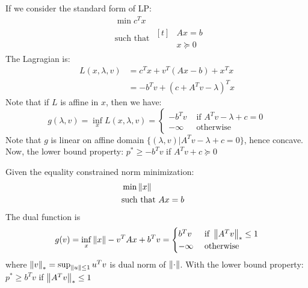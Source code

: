 \begin{remark}
    If we consider the standard form of LP:
    \begin{equation*}
    \begin{aligned}
        &\min c^Tx \\
        &\text{such that } \begin{aligned}[t]
            &Ax = b \\
            &x\succeq 0
        \end{aligned}
    \end{aligned}
    \end{equation*}
    The Lagragian is:
    \begin{equation*}
    \begin{aligned}
        L(x, \lambda, v) &= c^Tx + v^T(Ax-b) + x^Tx \\ 
        &= -b^Tv + (c+A^Tv-\lambda)^T x
    \end{aligned}
    \end{equation*}
    Note that if $L$ is affine in $x$, then we have:
    \begin{equation*}
        g(\lambda, v) = \inf_x L(x, \lambda, v) = \begin{cases}
            -b^Tv &\text{ if } A^Tv - \lambda + c = 0 \\
            -\infty &\text{ otherwise }
        \end{cases}
    \end{equation*}
    Note that $g$ is linear on affine domain $\{ (\lambda, v) | A^Tv - \lambda + c = 0 \}$, hence concave. Now, the lower bound property: $p^*\ge-b^Tv$ if $A^Tv + c\succeq0$
\end{remark}

\begin{remark}
    Given the equality constrained norm minimization:
    \begin{equation*}
    \begin{aligned}
        &\min \left\lVert x\right\rVert \\
        &\text{such that } \begin{aligned}[t]
            &Ax=b
        \end{aligned}
    \end{aligned}
    \end{equation*}
    The dual function is 
    \begin{equation*}
        g(v) = \inf_x\left\lVert x\right\rVert - v^TAx+b^Tv = \begin{cases}
            b^Tv & \text{ if } \left\lVert A^Tv\right\rVert_* \le 1 \\
            -\infty & \text{ otherwise }
        \end{cases}
    \end{equation*}
    where $\left\lVert v\right\rVert_* = \sup_{\left\lVert u\right\rVert\le1}u^Tv$ is dual norm of $\left\lVert\cdot\right\rVert$. With the lower bound property: $p^*\ge b^Tv$ if $\left\lVert A^Tv\right\rVert_*\le1$
\end{remark}

